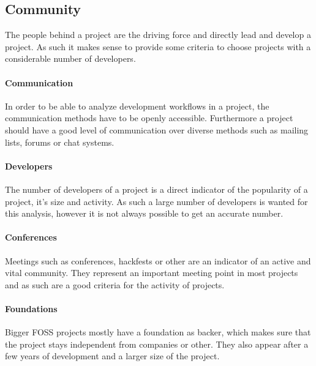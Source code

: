 

\subsection{Community} %

The people behind a project are the driving force and directly lead and develop
a project. As such it makes sense to provide some criteria to choose projects
with a considerable number of developers.

\paragraph{Communication} %

In order to be able to analyze development workflows in a project, the
communication methods have to be openly accessible. Furthermore a project
should have a good level of communication over diverse methods such as mailing
lists, forums or chat systems.


\paragraph{Developers} %

The number of developers of a project is a direct indicator of the popularity
of a project, it's size and activity. As such a large number of developers is
wanted for this analysis, however it is not always possible to get an accurate
number.


\paragraph{Conferences} %

Meetings such as conferences, hackfests or other are an indicator of an active
and vital community. They represent an important meeting point in most projects
and as such are a good criteria for the activity of projects.


\paragraph{Foundations} %

Bigger \ac{FOSS} projects mostly have a foundation as backer, which makes sure
that the project stays independent from companies or other. They also appear
after a few years of development and a larger size of the project.

